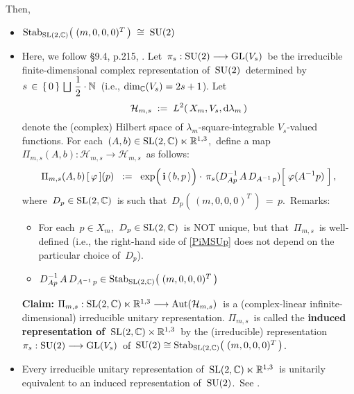 \vskip 0.5cm
\noindent
Then,
\begin{itemize}
\item
	$\textnormal{Stab}_{\textnormal{SL}(2,\mathbb{C})}\!\left(\;(m,0,0,0)^{T}\,\right) \;\cong\; \textnormal{SU}(2)$
\item
	Here, we follow \S9.4, p.215, \cite{Talagrand2022}.
	Let
	\,$\pi_{s} : \textnormal{SU}(2) \longrightarrow \textnormal{GL}(V_{s})$\,
	be the irreducible finite-dimensional complex representation of \,$\textnormal{SU}(2)$\,
	determined by
	\,$s \,\in\, \{\,0\,\} \,\bigsqcup\, \dfrac{1}{2}\cdot\mathbb{N}$\,
	(i.e., $\dim_{\mathbb{C}}(V_{s}) = 2s + 1$).
	Let
	\begin{equation*}
	\mathcal{H}_{m,s}
	\; := \;
		L^{2}\!\left(\,X_{m},V_{s},\textnormal{d}\lambda_{m}\,\right)
	\end{equation*}
	denote the (complex) Hilbert space of $\lambda_{m}$-square-integrable
	$V_{s}$-valued functions.
	For each
	\,$(A,b) \in \textnormal{SL}(2,\mathbb{C}) \ltimes \mathbb{R}^{1,3}$,\,
	define a map
	\,$\Pi_{m,s}\!\left(A,b\right) : \mathcal{H}_{m,s} \longrightarrow \mathcal{H}_{m,s}$\,
	as follows:
	\begin{equation}\label{PiMSUp}
	\Pi_{m,s}\!\left(A,b\right)[\,\varphi\,](p)
	\;\; := \;\;
		\exp\!\left(\,\overset{{\color{white}.}}{\i}\,\langle\,b,p\,\rangle\right)
		\cdot\,
		\pi_{s}(D^{-1}_{Ap}\,A\,D_{A^{-1}\,p})\!\left[\;
			\overset{{\color{white}.}}{\varphi(A^{-1}p)}
			\;\right],
	\end{equation}
	where
	\,$D_{p} \in \textnormal{SL}(2,\mathbb{C})$\, is such that \,$D_{p}\!\left(\,(m,0,0,0)^{T}\,\right) \,=\, p$.\,
	\vskip 0.1cm
	\noindent
	Remarks:
	\begin{itemize}
	\item
		For each \,$p \in X_{m}$,\, $D_{p} \in \textnormal{SL}(2,\mathbb{C})$\, is NOT unique,
		but that \,$\Pi_{m,s}$\, is well-defined
		(i.e., the right-hand side of \eqref{PiMSUp} does not depend on the particular choice of \,$D_{p}$).\,
	\item
		$D^{-1}_{Ap}\,A\,D_{A^{-1}\,p} \in \textnormal{Stab}_{\textnormal{SL}(2,\mathbb{C})}\!\left(\;(m,0,0,0)^{T}\,\right)$
	\end{itemize}
	\vskip 0.1cm
	\textbf{Claim:}\;
	$\Pi_{m,s} : \textnormal{SL}(2,\mathbb{C}) \ltimes \mathbb{R}^{1,3} \longrightarrow \textnormal{Aut}\!\left(\mathcal{H}_{m,s}\right)$\,
	is a (complex-linear infinite-dimensional) irreducible unitary representation.
	\vskip 0.1cm
	$\Pi_{m,s}$\, is called the \textbf{induced representation of \,$\textnormal{SL}(2,\mathbb{C}) \times \mathbb{R}^{1,3}$}\,
	by the (irreducible) representation
	\,$\pi_{s} : \textnormal{SU}(2) \longrightarrow \textnormal{GL}(V_{s})$\,
	of
	\,$\textnormal{SU}(2) \cong \textnormal{Stab}_{\textnormal{SL}(2,\mathbb{C})}\!\left(\;(m,0,0,0)^{T}\,\right)$.\,
\item
	Every irreducible unitary representation of
	\,$\textnormal{SL}(2,\mathbb{C}) \ltimes \mathbb{R}^{1,3}$\,
	is unitarily equivalent to an induced representation of
	\,$\textnormal{SU}(2)$.\,
	See \cite{Wigner1939}.
\end{itemize}

